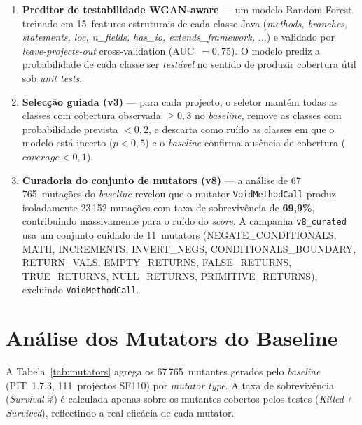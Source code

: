 \documentclass[12pt,a4paper]{article}
\begin{document}
\begin{enumerate}
  \item \textbf{Preditor de testabilidade WGAN-aware} --- um modelo Random Forest treinado
        em 15~features estruturais de cada classe Java (\textit{methods, branches,
        statements, loc, n\_fields, has\_io, extends\_framework, $\ldots$}) e validado
        por \textit{leave-projects-out} cross-validation (AUC~$=0{,}75$). O modelo prediz
        a probabilidade de cada classe ser \textit{testável} no sentido de produzir
        cobertura útil sob \textit{unit tests}.

  \item \textbf{Selecção guiada (v3)} --- para cada projecto, o seletor mantém todas as
        classes com cobertura observada $\geq 0{,}3$ no \textit{baseline}, remove as classes
        com probabilidade prevista $<0{,}2$, e descarta como ruído as classes em que
        o modelo está incerto ($p<0{,}5$) e o \textit{baseline} confirma ausência de
        cobertura ($coverage<0{,}1$).

  \item \textbf{Curadoria do conjunto de mutators (v8)} --- a análise de 67\,765~mutações
        do \textit{baseline} revelou que o mutator \texttt{VoidMethodCall} produz isoladamente
        23\,152 mutações com taxa de sobrevivência de \textbf{69,9\%}, contribuindo
        massivamente para o ruído do \textit{score}. A campanha \texttt{v8\_curated} usa um
        conjunto cuidado de 11~mutators (NEGATE\_CONDITIONALS, MATH, INCREMENTS,
        INVERT\_NEGS, CONDITIONALS\_BOUNDARY, RETURN\_VALS, EMPTY\_RETURNS, FALSE\_RETURNS,
        TRUE\_RETURNS, NULL\_RETURNS, PRIMITIVE\_RETURNS), excluindo \texttt{VoidMethodCall}.
\end{enumerate}

\section{Análise dos Mutators do Baseline}

A Tabela~\ref{tab:mutators} agrega os 67\,765~mutantes gerados pelo \textit{baseline}
(PIT~1.7.3, 111~projectos SF110) por \textit{mutator type}. A taxa de sobrevivência
(\textit{Survival\,\%}) é calculada apenas sobre os mutantes cobertos pelos testes
(\textit{Killed\,+\,Survived}), reflectindo a real eficácia de cada mutator.
\end{document}
